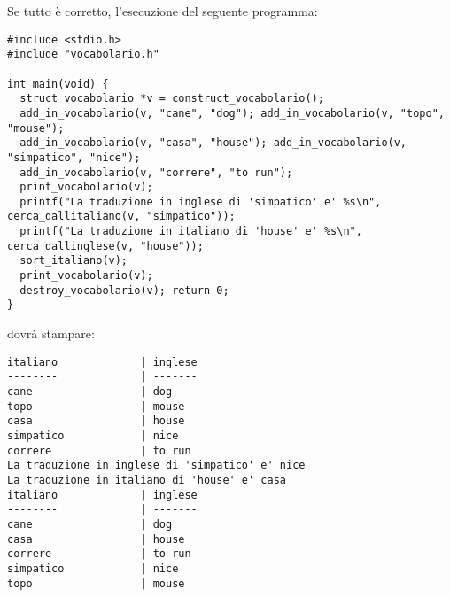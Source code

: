 \documentclass[12pt]{article}
\begin{document}
\noindent
Se tutto \`e corretto, l'esecuzione del seguente programma:

{\scriptsize
\begin{verbatim}
#include <stdio.h>
#include "vocabolario.h"

int main(void) {
  struct vocabolario *v = construct_vocabolario();
  add_in_vocabolario(v, "cane", "dog"); add_in_vocabolario(v, "topo", "mouse");
  add_in_vocabolario(v, "casa", "house"); add_in_vocabolario(v, "simpatico", "nice");
  add_in_vocabolario(v, "correre", "to run");
  print_vocabolario(v);
  printf("La traduzione in inglese di 'simpatico' e' %s\n", cerca_dallitaliano(v, "simpatico"));
  printf("La traduzione in italiano di 'house' e' %s\n", cerca_dallinglese(v, "house"));
  sort_italiano(v);
  print_vocabolario(v);
  destroy_vocabolario(v); return 0;
}
\end{verbatim}}

\noindent
dovr\`a stampare:

{\scriptsize
\begin{verbatim}
italiano             | inglese             
--------             | -------             
cane                 | dog                 
topo                 | mouse               
casa                 | house               
simpatico            | nice                
correre              | to run              
La traduzione in inglese di 'simpatico' e' nice
La traduzione in italiano di 'house' e' casa
italiano             | inglese             
--------             | -------             
cane                 | dog                 
casa                 | house               
correre              | to run              
simpatico            | nice                
topo                 | mouse
\end{verbatim}}
\end{document}
